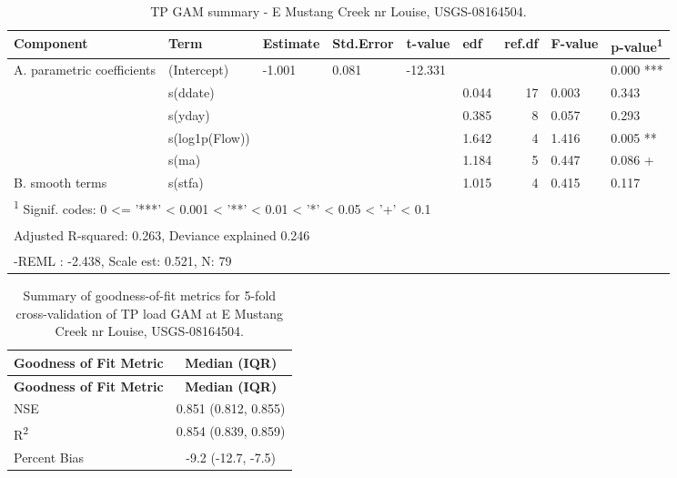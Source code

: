 \documentclass[
]{article}
\newenvironment{widestuff}{\begin{table}[h]\begin{adjustwidth}{-4.5cm}{-4.5cm}\centering}{\end{adjustwidth}\end{table}}
\begin{document}
\begin{widestuff}

\caption{TP GAM summary - E Mustang Creek nr Louise, USGS-08164504.}
\centering
\begin{tabular}[t]{llllllrll}
\toprule
Component & Term & Estimate & Std.Error & t-value & edf & ref.df & F-value & p-value\textsuperscript{1}\\
\midrule
A. parametric coefficients & (Intercept) & -1.001 & 0.081 & -12.331 &  &  &  & 0.000 ***\\
\cmidrule{1-9}
 & s(ddate) &  &  &  & 0.044 & 17 & 0.003 & 0.343\\

 & s(yday) &  &  &  & 0.385 & 8 & 0.057 & 0.293\\

 & s(log1p(Flow)) &  &  &  & 1.642 & 4 & 1.416 & 0.005 **\\

 & s(ma) &  &  &  & 1.184 & 5 & 0.447 & 0.086 +\\

\multirow[t]{-5}{*}{\raggedright\arraybackslash B. smooth terms} & s(stfa) &  &  &  & 1.015 & 4 & 0.415 & 0.117\\
\bottomrule
\multicolumn{9}{l}{\textsuperscript{1} Signif. codes: 0 <= '***' < 0.001 < '**' < 0.01 < '*' < 0.05 < '+' < 0.1}\\
\multicolumn{9}{l}{\textsuperscript{} Adjusted R-squared: 0.263, Deviance explained 0.246}\\
\multicolumn{9}{l}{\textsuperscript{} -REML : -2.438, Scale est: 0.521, N: 79}\\
\end{tabular}
\end{widestuff}

\hypertarget{tbl-TP08164504-CV}{}
\begin{longtable}[]{@{}lc@{}}
\caption{\label{tbl-TP08164504-CV}Summary of goodness-of-fit metrics for
5-fold cross-validation of TP load GAM at E Mustang Creek nr Louise,
USGS-08164504.}\tabularnewline
\toprule()
\textbf{Goodness of Fit Metric} & \textbf{Median (IQR)} \\
\midrule()
\endfirsthead
\toprule()
\textbf{Goodness of Fit Metric} & \textbf{Median (IQR)} \\
\midrule()
\endhead
NSE & 0.851 (0.812, 0.855) \\
R\textsuperscript{2} & 0.854 (0.839, 0.859) \\
Percent Bias & -9.2 (-12.7, -7.5) \\
\bottomrule()
\end{longtable}
\end{document}
